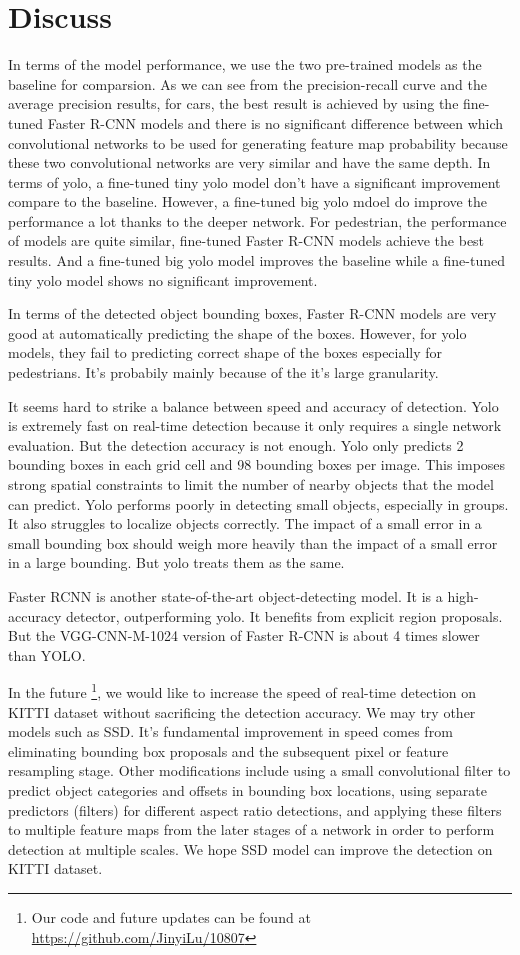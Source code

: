 \section{Discuss}
In terms of the model performance, we use the two pre-trained 
models as the baseline for comparsion.
As we can see from the precision-recall curve and the average precision results, for cars, the best result is achieved by 
using the fine-tuned Faster R-CNN models and there is 
no significant difference between which convolutional networks 
to be used for generating feature map probability because 
these two convolutional networks are very similar 
and have the same depth.
In terms of yolo, 
a fine-tuned tiny yolo model don't have a significant 
improvement compare to the baseline.
However, a fine-tuned big yolo mdoel do improve the performance 
a lot thanks to the deeper network.
For pedestrian, the performance of models are quite similar,
fine-tuned Faster R-CNN models achieve the best results. 
And a fine-tuned big yolo model improves the baseline while 
a fine-tuned tiny yolo model shows no significant improvement.

In terms of the detected object bounding boxes, 
Faster R-CNN models are very good at automatically predicting the 
shape of the boxes. However, for yolo models, 
they fail to predicting correct shape of the boxes 
especially for pedestrians. It's probabily mainly 
because of the it's large granularity.


It seems hard to strike a balance between speed and accuracy of detection. Yolo is extremely fast on real-time detection because it only requires a single network evaluation. But the detection accuracy is not enough. Yolo only predicts 2 bounding boxes in each grid cell and 98 bounding boxes per image. This imposes strong spatial constraints to limit the number of nearby objects that the model can predict. Yolo performs poorly in detecting small objects, especially in groups. It also struggles to localize objects correctly. The impact of a small error in a small bounding box should weigh more heavily than the impact of a small error in a large bounding. But yolo treats them as the same.

Faster RCNN is another state-of-the-art object-detecting model. It is a high-accuracy detector, outperforming yolo. It benefits from explicit region proposals. But the VGG-CNN-M-1024 version of Faster R-CNN is about 4 times slower than YOLO.

In the future \footnote{Our code and future updates can be found at \url{https://github.com/JinyiLu/10807}}, we would like to increase the speed of real-time detection on KITTI dataset without sacrificing the detection accuracy. We may try other models such as SSD. It's fundamental improvement in speed comes from eliminating bounding box proposals and the subsequent pixel or feature resampling stage. Other modifications include using a small convolutional filter to predict object categories and offsets in bounding box locations, using separate predictors (filters) for different aspect ratio detections, and applying these filters to multiple feature maps from the later stages of a network in order to perform detection at multiple scales. We hope SSD model can improve the detection on KITTI dataset.

